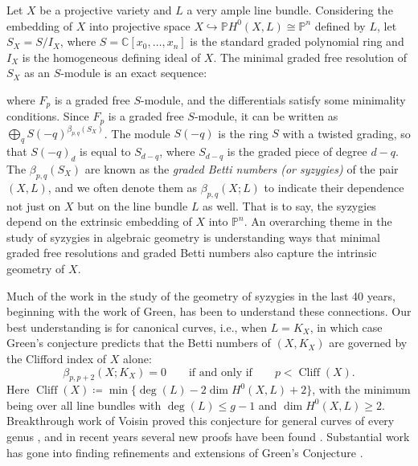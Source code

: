 \documentclass[11pt,reqno]{amsart}
\theoremstyle{remark}
\newcommand{\cliff}{\operatorname{Cliff}}
\newcommand{\CC}{\mathbb{C}}
\newcommand{\PP}{\mathbb{P}}
\begin{document}
Let $X$ be a projective variety and $L$ a very ample line bundle. Considering the embedding of $X$ into projective space $X \hookrightarrow \PP H^{0}(X,L)\cong \PP^{n}$ defined by $L$, let $S_{X}=S/I_{X}$, where $S=\CC[x_{0},\ldots,x_{n}]$ is the standard graded polynomial ring and $I_{X}$ is the homogeneous defining ideal of $X$. The minimal graded free resolution of $S_{X}$ as an $S$-module is an exact sequence:
\begin{center}
\end{center}
where $F_{p}$ is a graded free $S$-module, and the differentials satisfy some minimality conditions. Since $F_{p}$ is a graded free $S$-module, it can be written as $\bigoplus_{q}S(-q)^{\beta_{p,q}(S_{X})}$. The module $S(-q)$ is the ring $S$ with a twisted grading, so that $S(-q)_{d}$ is equal to $S_{d-q}$, where $S_{d-q}$ is the graded piece of degree $d-q$. The $\beta_{p,q}(S_{X})$ are known as the \emph{graded Betti numbers (or syzygies)} of the pair $(X,L)$, and we often denote them as $\beta_{p,q}(X;L)$ to indicate their dependence not just on $X$ but on the line bundle $L$ as well. That is to say, the syzygies depend on the extrinsic embedding of $X$ into $\PP^{n}$. An overarching theme in the study of syzygies in algebraic geometry is understanding ways that minimal graded free resolutions and graded Betti numbers also capture the intrinsic geometry of $X$.

Much of the work in the study of the geometry of syzygies in the last 40 years, beginning with the work of Green, has been to understand these connections. Our best understanding is for canonical curves, i.e., when $L = K_X$, in which case Green's conjecture \cite{green84-I} predicts that the Betti numbers of $(X,K_X)$ are governed by the Clifford index of $X$ alone:
\begin{equation}\label{eq:greens}
\beta_{p,p+2}(X;K_X)=0 \quad \quad \text{if and only if} \quad \quad p<\cliff(X).
\end{equation}
Here $\cliff(X)\coloneqq \min \{\deg(L) - 2 \dim H^{0}(X,L)+2\}$, with the minimum being over all line bundles with $\deg(L) \leq g-1$ and $ \dim H^0(X,L) \geq 2$. Breakthrough work of Voisin proved this conjecture for general curves of every genus \cite{voisin02,voisin05}, and in recent years several new proofs have been found \cite{aprodu19,kemeny21}. Substantial work has gone into finding refinements and extensions of Green's Conjecture \cite{farkasMustataPopa03,chiodoEFS13,farkasKemeny16,farkasKemeny17,deopurkar18,kemeny24}.
\end{document}

